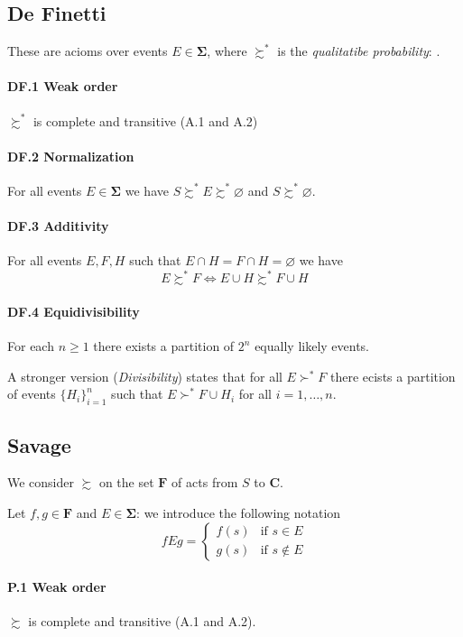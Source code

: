 \documentclass[landscape, 12pt]{extarticle}
\begin{document}
\begin{multicols}{2}
	\subsection{De Finetti}
	These are acioms over events $E \in \bm \Sigma$,
	where $\succsim^*$ is the \textit{qualitatibe probability}:
	.

	\paragraph{DF.1 Weak order}
	$\succsim^*$ is complete and transitive (A.1 and A.2)

	\paragraph{DF.2 Normalization}
	For all events $E \in \bm \Sigma$
	we have $S \succsim^* E \succsim^* \varnothing$
	and $S \succsim^* \varnothing$.

	\paragraph{DF.3 Additivity}
	For all events $E, F, H$ such that $E \cap H = F \cap H = \varnothing$ we have
	\[
		E \succsim^* F \iff E \cup H \succsim^* F \cup H
	\]

	\paragraph{DF.4 Equidivisibility}
	For each $n \geq 1$ there exists a partition of $2^n$ equally likely events.

	A stronger version (\textit{Divisibility}) states that for all $E \succ^* F$ there ecists
	a partition of events $\{H_i\}^n_{i = 1}$
	such that $E \succ^* F \cup H_i$ for all $i = 1, \dots, n$.

	\subsection{Savage}
	We consider $\succsim$ on the set $\bm F$ of acts from $S$ to $\bm C$.

	Let $f, g \in \bm F$ and $E \in \bm \Sigma$: we introduce the following notation
	\[
		fEg = \begin{cases}
			f(s) & \text{if } s \in E    \\
			g(s) & \text{if } s \notin E
		\end{cases}
	\]

	\paragraph{P.1 Weak order}
	$\succsim$ is complete and transitive (A.1 and A.2).


\end{multicols}
\end{document}
